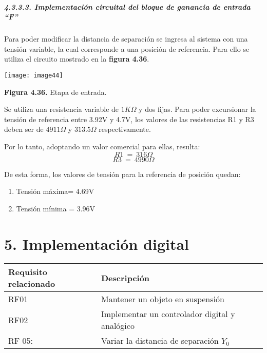 \documentclass{article} %
\begin{document}
\noindent 
\subparagraph{4.3.3.3. Implementaci\'{o}n circuital del bloque de ganancia de entrada ``F''}

\noindent Para poder modificar la distancia de separaci\'{o}n se ingresa al sistema con una tensi\'{o}n variable, la cual corresponde a una posici\'{o}n de referencia. Para ello se utiliza el circuito mostrado en la \textbf{figura 4.36}.

\noindent \texttt{[image: image44]}

\noindent \textbf{Figura 4.36. }Etapa de entrada.

\noindent 

\noindent Se utiliza una resistencia variable de $1K\mathit{\Omega}$ y dos fijas. Para poder excursionar la tensi\'{o}n de referencia entre 3.92V y 4.7V, los valores de las resistencias R1 y R3 deben ser de $4911\mathit{\Omega}$ y $313.5\mathit{\Omega}$ respectivamente. 

\noindent 

\noindent Por lo tanto, adoptando un valor comercial para ellas, resulta:
\[R1\ =\ 316\mathit{\Omega}\] 
\[R3\ =\ 4990\mathit{\Omega}\] 


\noindent De esta forma, los valores de tensi\'{o}n para la referencia de posici\'{o}n quedan:

\begin{enumerate}
\item  Tensi\'{o}n m\'{a}xima= 4.69V

\item  Tensi\'{o}n m\'{i}nima = 3.96V
\end{enumerate}

\noindent 
\section{}

\noindent \eject 

\noindent 
\section{5. Implementaci\'{o}n digital}

\begin{tabular}{|p{2.1in}|p{2.1in}|} \hline 
Requisito relacionado & Descripci\'{o}n \\ \hline 
RF01 & Mantener un objeto en suspensi\'{o}n \\ \hline 
RF02 & Implementar un controlador digital y anal\'{o}gico \\ \hline 
RF 05:  & Variar la distancia de separaci\'{o}n $Y_0$\newline  \\ \hline 
\end{tabular}
\end{document}
